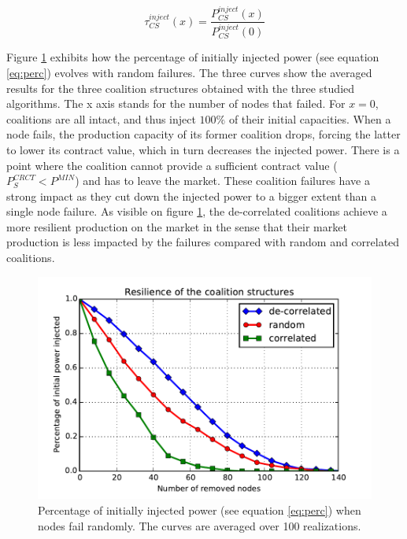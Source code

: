\documentclass[conference]{IEEEtran}
\begin{document}
\begin{equation}
\tau_{CS}^{inject}(x) = \dfrac{P_{CS}^{inject}(x)}{P_{CS}^{inject}(0)} 
\label{eq:perc}
\end{equation}

Figure \ref{fig:resilience} exhibits how the percentage of initially injected power (see equation \ref{eq:perc}) evolves with random failures. The three curves show the averaged results for the three coalition structures obtained with the three studied algorithms. The x axis stands for the number of nodes that failed. For $ x = 0 $, coalitions are all intact, and thus inject $ 100\% $ of their initial capacities. When a node fails, the production capacity of its former coalition drops, forcing the latter to lower its contract value, which in turn decreases the injected power. There is a point where the coalition cannot provide a sufficient contract value ($P_{S}^{CRCT} < P^{MIN} $) and has to leave the market. These coalition failures have a strong impact as they cut down the injected power to a bigger extent than a single node failure. As visible on figure \ref{fig:resilience}, the de-correlated coalitions achieve a more resilient production on the market in the sense that their market production is less impacted by the failures compared with random and correlated coalitions. 

\begin{figure}
\includegraphics[scale=.6]{./figures/resilience/resilience.pdf}
\caption{Percentage of initially injected power (see equation \ref{eq:perc}) when nodes fail randomly. The curves are averaged over 100 realizations.}
\label{fig:resilience}
\end{figure}
\end{document}
